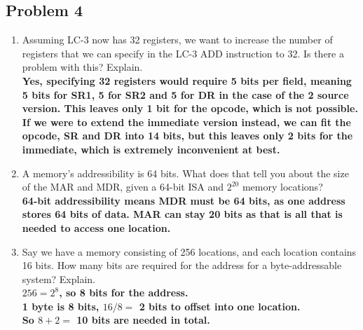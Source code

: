 \documentclass{article}
\begin{document}
\newpage
\subsection*{Problem 4}
\begin{enumerate}[label=\alph*.]
\item Assuming LC-3 now has 32 registers, we want to increase the number of registers that we can specify in the LC-3 ADD instruction to 32. Is there a problem with this? Explain.
\\
\textbf{Yes, specifying 32 registers would require 5 bits per field, meaning 5 bits for SR1, 5 for SR2 and 5 for DR in the case of the 2 source version. This leaves only 1 bit for the opcode, which is not possible. If we were to extend the immediate version instead, we can fit the opcode, SR and DR into 14 bits, but this leaves only 2 bits for the immediate, which is extremely inconvenient at best.}

\item A memory's addressibility is 64 bits. What does that tell you about the size of the MAR and MDR, given a 64-bit ISA and $2^{20}$ memory locations?
\\
\textbf{64-bit addressibility means MDR must be 64 bits, as one address stores 64 bits of data. MAR can stay 20 bits as that is all that is needed to access one location.}

\item Say we have a memory consisting of 256 locations, and each location contains 16 bits. How many bits are required for the address for a byte-addressable system? Explain.
\\
\textbf{$256 = 2^8$, so 8 bits for the address. \\
        1 byte is 8 bits, $16/8 = $ 2 bits to offset into one location. \\
        So $8 + 2 = $ 10 bits are needed in total.}
\end{enumerate}
\end{document}
